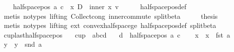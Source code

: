 \begin{isabellebody}
\ \ \isamarkupfalse%
\ {\isachardoublequoteopen}halfspace{\isacharunderscore}{\kern0pt}pos\ a\ c\ {\isacharequal}{\kern0pt}\ {\isacharbraceleft}{\kern0pt}x{\isachardot}{\kern0pt}\ {\isacharquery}{\kern0pt}D\ {\isasymle}\ inner\ x\ {\isacharquery}{\kern0pt}v{\isacharbraceright}{\kern0pt}{\isachardoublequoteclose}\isanewline
\ \ \ \ \isamarkupfalse%
\ halfspace{\isacharunderscore}{\kern0pt}pos{\isacharunderscore}{\kern0pt}def\ \isamarkupfalse%
\ {\isacharparenleft}{\kern0pt}metis\ {\isacharparenleft}{\kern0pt}no{\isacharunderscore}{\kern0pt}types{\isacharcomma}{\kern0pt}\ lifting{\isacharparenright}{\kern0pt}\ Collect{\isacharunderscore}{\kern0pt}cong\ inner{\isacharunderscore}{\kern0pt}commute\ split{\isacharunderscore}{\kern0pt}beta{\isacharparenright}{\kern0pt}\isanewline
\ \ \isamarkupfalse%
\ \isamarkupfalse%
\ {\isacharquery}{\kern0pt}thesis\isanewline
\ \ \ \ \isamarkupfalse%
\ {\isacharparenleft}{\kern0pt}metis\ {\isacharparenleft}{\kern0pt}no{\isacharunderscore}{\kern0pt}types{\isacharcomma}{\kern0pt}\ lifting{\isacharparenright}{\kern0pt}\ ext\ convex{\isacharunderscore}{\kern0pt}halfspace{\isacharunderscore}{\kern0pt}ge\ halfspace{\isacharunderscore}{\kern0pt}pos{\isacharunderscore}{\kern0pt}def\ split{\isacharunderscore}{\kern0pt}beta{\isacharparenright}{\kern0pt}\isanewline
{}\isamarkupfalse%
%
\endisatagproof
{\isafoldproof}%
%
\isadelimproof
\isanewline
%
\endisadelimproof
\isanewline
{}\isamarkupfalse%
\ cup{}{\isacharunderscore}{\kern0pt}last{\isacharunderscore}{\kern0pt}halfspace{\isacharunderscore}{\kern0pt}pos{\isacharcolon}{\kern0pt}\isanewline
\ \ \ {\isachardoublequoteopen}cup\ {}\ {\isacharbrackleft}{\kern0pt}a{\isacharcomma}{\kern0pt}b{\isacharcomma}{\kern0pt}c{\isacharcomma}{\kern0pt}d{\isacharbrackright}{\kern0pt}{\isachardoublequoteclose}\isanewline
\ \ \ {\isachardoublequoteopen}d\ {\isasymin}\ halfspace{\isacharunderscore}{\kern0pt}pos\ a\ c{\isachardoublequoteclose}\isanewline
%
\isadelimproof
%
\endisadelimproof
%
\isatagproof
{}\isamarkupfalse%
{\isacharminus}{\kern0pt}\isanewline
\ \ \isamarkupfalse%
\ x{}\ \ {\isachardoublequoteopen}x{}\ {\isasymequiv}\ fst\ a{\isachardoublequoteclose}\isanewline
\ \ \isamarkupfalse%
\ y{}\ \ {\isachardoublequoteopen}y{}\ {\isasymequiv}\ snd\ a{\isachardoublequoteclose}\isanewline

\end{isabellebody}
